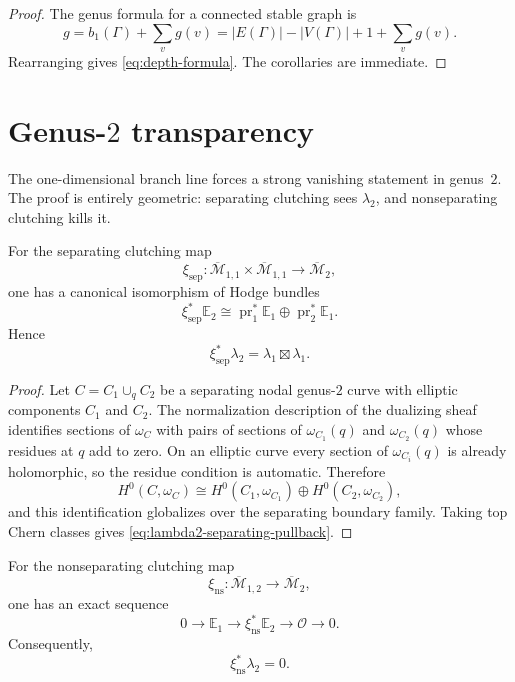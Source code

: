 \begin{proof}
The genus formula for a connected stable graph is
\[
 g=b_1(\Gamma)+\sum_{v}g(v)
 =|E(\Gamma)|-|V(\Gamma)|+1+\sum_v g(v).
\]
Rearranging gives \eqref{eq:depth-formula}. The corollaries are
immediate.
\end{proof}

\section{Genus-\texorpdfstring{$2$}{2} transparency}
\label{sec:blr-genus-two-transparency}

The one-dimensional branch line forces a strong vanishing statement in
genus~\(2\). The proof is entirely geometric: separating clutching sees
\(\lambda_2\), and nonseparating clutching kills it.

\begin{lemma}
\label{lem:separating-hodge-splitting}
For the separating clutching map
\[
\xi_{\mathrm{sep}}\colon
\overline{\mathcal M}_{1,1}\times\overline{\mathcal M}_{1,1}
\longrightarrow
\overline{\mathcal M}_{2},
\]
one has a canonical isomorphism of Hodge bundles
\[
\xi_{\mathrm{sep}}^*\mathbb E_2
\cong
\operatorname{pr}_1^*\mathbb E_1
\oplus
\operatorname{pr}_2^*\mathbb E_1.
\]
Hence
\begin{equation}
\label{eq:lambda2-separating-pullback}
\xi_{\mathrm{sep}}^*\lambda_2=\lambda_1\boxtimes\lambda_1.
\end{equation}
\end{lemma}

\begin{proof}
Let \(C=C_1\cup_q C_2\) be a separating nodal genus-\(2\) curve with
elliptic components \(C_1\) and \(C_2\). The normalization description
of the dualizing sheaf identifies sections of \(\omega_C\) with pairs of
sections of \(\omega_{C_1}(q)\) and \(\omega_{C_2}(q)\) whose residues at
\(q\) add to zero. On an elliptic curve every section of
\(\omega_{C_i}(q)\) is already holomorphic, so the residue condition is
automatic. Therefore
\[
H^0(C,\omega_C)
\cong
H^0(C_1,\omega_{C_1})\oplus H^0(C_2,\omega_{C_2}),
\]
and this identification globalizes over the separating boundary family.
Taking top Chern classes gives
\eqref{eq:lambda2-separating-pullback}.
\end{proof}

\begin{lemma}
\label{lem:nonseparating-hodge-extension}
For the nonseparating clutching map
\[
\xi_{\mathrm{ns}}\colon
\overline{\mathcal M}_{1,2}
\longrightarrow
\overline{\mathcal M}_2,
\]
one has an exact sequence
\[
0\longrightarrow \mathbb E_1
\longrightarrow \xi_{\mathrm{ns}}^*\mathbb E_2
\longrightarrow \mathcal O
\longrightarrow 0.
\]
Consequently,
\begin{equation}
\label{eq:lambda2-nonseparating-pullback}
\xi_{\mathrm{ns}}^*\lambda_2=0.
\end{equation}
\end{lemma}

